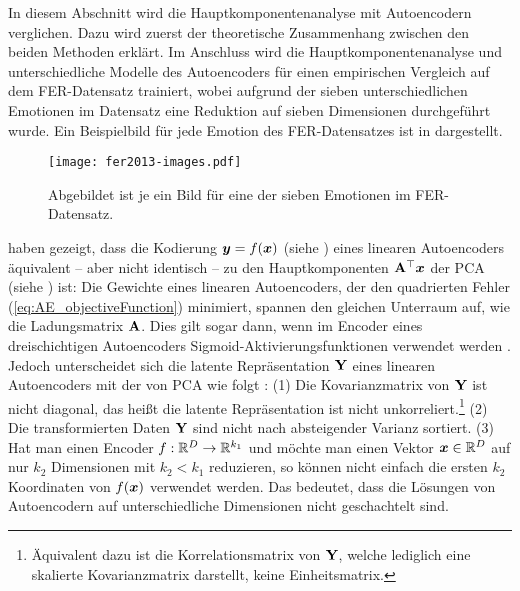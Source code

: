 In diesem Abschnitt wird die Hauptkomponentenanalyse mit Autoencodern verglichen. Dazu wird zuerst
der theoretische Zusammenhang zwischen den beiden Methoden erklärt. Im Anschluss wird die
Hauptkomponentenanalyse und unterschiedliche Modelle des Autoencoders für einen empirischen
Vergleich auf dem FER-Datensatz trainiert, wobei aufgrund der sieben unterschiedlichen Emotionen im
Datensatz eine Reduktion auf sieben Dimensionen durchgeführt wurde. Ein Beispielbild für jede
Emotion des FER-Datensatzes ist in  dargestellt.

\begin{figure}[ht]
	\centering
	\texttt{[image: fer2013-images.pdf]}
	\caption[Beispielbilder des FER-Datensatzes]{Abgebildet ist je ein Bild für eine der sieben Emotionen im FER-Datensatz.}
	\label{fig:FER-Datensatz-Beispiele}
\end{figure}

\textcites{Baldi.1989}{Bourlard.1988} haben gezeigt, dass die Kodierung $\bm{y} = f(\bm{x})$ (siehe ) eines linearen Autoencoders äquivalent -- aber nicht identisch -- zu den Hauptkomponenten $\mathbf{A}^\top\bm{x}$ der PCA (siehe ) ist: Die Gewichte eines linearen Autoencoders, der den quadrierten Fehler (\eqref{eq:AE_objectiveFunction}) minimiert, spannen den gleichen Unterraum auf, wie die Ladungsmatrix $\mathbf{A}$. Dies gilt sogar dann, wenn im Encoder eines dreischichtigen Autoencoders Sigmoid-Aktivierungsfunktionen verwendet werden \parencite[291, 293]{Bourlard.1988}. Jedoch unterscheidet sich die latente Repräsentation $\mathbf{Y}$
eines linearen Autoencoders mit der von PCA wie folgt \parencite[3]{Plaut.2018}: (1) Die Kovarianzmatrix von $\mathbf{Y}$ ist nicht diagonal, das heißt die
latente Repräsentation ist nicht unkorreliert.\footnote{Äquivalent dazu ist die Korrelationsmatrix
	von $\mathbf{Y}$, welche lediglich eine skalierte Kovarianzmatrix darstellt, keine Einheitsmatrix.}
(2) Die transformierten Daten $\mathbf{Y}$ sind nicht nach absteigender Varianz sortiert. (3) Hat man
einen Encoder $f: \mathbb{R}^D \rightarrow \mathbb{R}^{k_1}$ und möchte man einen Vektor $\bm{x} \in
	\mathbb{R}^D$ auf nur $k_2$ Dimensionen mit $k_2 < k_1$ reduzieren, so können nicht einfach die ersten
$k_2$ Koordinaten von $f(\bm{x})$ verwendet werden. Das bedeutet, dass die Lösungen von
Autoencodern auf unterschiedliche Dimensionen nicht geschachtelt sind.

